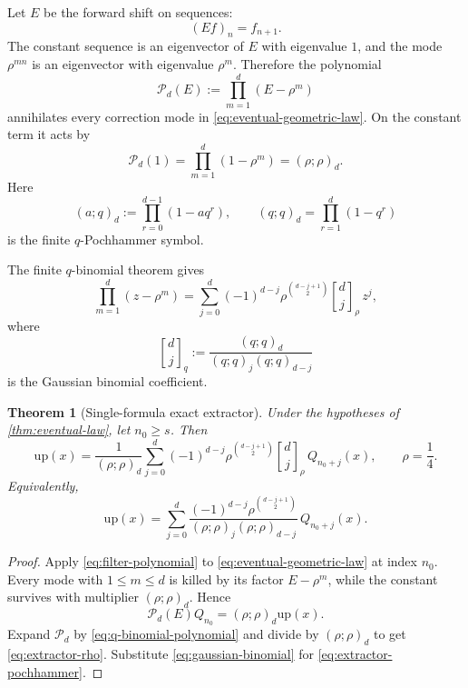 \documentclass[11pt,oneside]{article}
\numberwithin{equation}{section}
\newtheorem{theorem}{Theorem}[section]
\theoremstyle{definition}
\theoremstyle{remark}
\newcommand{\upf}{\mathrm{up}}
\newcommand{\qbinom}[3]{\genfrac{[}{]}{0pt}{}{#1}{#2}_{#3}}
\begin{document}
Let $E$ be the forward shift on sequences:
\begin{equation}
 (Ef)_n=f_{n+1}.
 \label{eq:shift}
\end{equation}
The constant sequence is an eigenvector of $E$ with eigenvalue $1$, and the
mode $\rho^{mn}$ is an eigenvector with eigenvalue $\rho^m$.  Therefore the
polynomial
\begin{equation}
 \mathcal P_d(E):=\prod_{m=1}^{d}(E-\rho^m)
 \label{eq:filter-polynomial}
\end{equation}
annihilates every correction mode in \eqref{eq:eventual-geometric-law}.  On the
constant term it acts by
\begin{equation}
 \mathcal P_d(1)=\prod_{m=1}^{d}(1-\rho^m)=(\rho;\rho)_d.
 \label{eq:filter-at-one}
\end{equation}
Here
\begin{equation}
 (a;q)_d:=\prod_{r=0}^{d-1}(1-aq^r),
 \qquad
 (q;q)_d=\prod_{r=1}^{d}(1-q^r)
 \label{eq:q-pochhammer}
\end{equation}
is the finite $q$-Pochhammer symbol.

The finite $q$-binomial theorem gives
\begin{equation}
 \prod_{m=1}^{d}(z-\rho^m)
 =\sum_{j=0}^{d}(-1)^{d-j}
 \rho^{\binom{d-j+1}{2}}
 \qbinom{d}{j}{\rho}\,z^j,
 \label{eq:q-binomial-polynomial}
\end{equation}
where
\begin{equation}
 \qbinom{d}{j}{q}:=\frac{(q;q)_d}{(q;q)_j(q;q)_{d-j}}
 \label{eq:gaussian-binomial}
\end{equation}
is the Gaussian binomial coefficient.

\begin{theorem}[Single-formula exact extractor]
\label{thm:exact-extractor}
Under the hypotheses of \cref{thm:eventual-law}, let $n_0\ge s$.  Then
\begin{equation}
 \boxed{\displaystyle
 \upf(x)=\frac1{(\rho;\rho)_d}
 \sum_{j=0}^{d}(-1)^{d-j}\rho^{\binom{d-j+1}{2}}
 \qbinom{d}{j}{\rho}\,Q_{n_0+j}(x),
 \qquad \rho=\frac14.}
 \label{eq:extractor-rho}
\end{equation}
Equivalently,
\begin{equation}
 \boxed{\displaystyle
 \upf(x)=\sum_{j=0}^{d}
 \frac{(-1)^{d-j}\rho^{\binom{d-j+1}{2}}}
 {(\rho;\rho)_j(\rho;\rho)_{d-j}}\,Q_{n_0+j}(x).}
 \label{eq:extractor-pochhammer}
\end{equation}
\end{theorem}

\begin{proof}
Apply \eqref{eq:filter-polynomial} to
\eqref{eq:eventual-geometric-law} at index $n_0$.  Every mode with
$1\le m\le d$ is killed by its factor $E-\rho^m$, while the constant survives
with multiplier $(\rho;\rho)_d$.  Hence
\[
 \mathcal P_d(E)Q_{n_0}=(\rho;\rho)_d\upf(x).
\]
Expand $\mathcal P_d$ by \eqref{eq:q-binomial-polynomial} and divide by
$(\rho;\rho)_d$ to get \eqref{eq:extractor-rho}.  Substitute
\eqref{eq:gaussian-binomial} for \eqref{eq:extractor-pochhammer}.
\end{proof}
\end{document}
